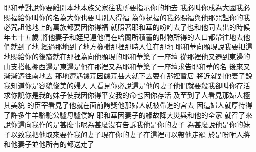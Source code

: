 \bchapter%
耶和華對說\chientien 你要離開本地\chientien 本族\chientien 父家\chientien 往我所要指示你的地去\chuan 
{}我必叫你成為大國\yuentien 我必賜福給你\chientien 叫你的名為大\chientien 你也要叫別人得福\yuentien 
{}為你祝福的\chientien 我必賜福與他\chientien 那咒詛你的\chientien 我必咒詛他\chientien 地上的萬族都要因你得福\chuan 
{}就照著耶和華的吩咐去了\yuentien{}也和他同去\yuentien {}出的時候\chientien 年七十五歲\chuan 
{}將他妻子\chientien 和姪兒\chientien 連他們在哈蘭所積蓄的財物\chientien 所得的人口\chientien 都帶往地去\yuentien 他們就到了地\chuan 
{}經過那地\chientien 到了地方橡樹那裡\yuentien 那時人住在那地\chuan 
{}耶和華向顯現\chientien 說\chientien 我要把這地賜給你的後裔\yuentien {}就在那裡為向他顯現的耶和華築了一座壇\chuan 
{}從那裡他又遷到東邊的山\chientien 支搭帳棚\yuentien 西邊是\chientien 東邊是\yuentien 他在那裡又為耶和華築了一座壇\chientien 求告耶和華的名\chuan 
{}後來又漸漸遷往南地去\chuan\Chuan
{}那地遭遇饑荒\chientien 因饑荒甚大\chientien{}就下去\chientien 要在那裡暫居\chuan 
{}將近就對他妻子說\chientien 我知道你是容貌俊美的婦人\yuentien 
{}人看見你必說\chientien 這是他的妻子\chientien 他們就要殺我\chientien 卻叫你存活\chuan 
{}求你說\chientien 你是我的妹子\chientien 使我因你得平安\chientien 我的命也因你存活\chuan 
{}及至到了\chientien {}人看見那婦人極其美貌\chuan 
{}的臣宰看見了他\chientien 就在面前誇獎他\yuentien 那婦人就被帶進的宮去\chuan 
{}因這婦人就厚待\chientien {}得了許多牛\chientien 羊\chientien 駱駝\chientien 公驢\chientien 母驢\chientien 僕婢\chuan 
{}耶和華因妻子的緣故\chientien 降大災與和他的全家\chuan 
{}就召了來\chientien 說\chientien 你這向我作的是甚麼事呢\chientien 為甚麼沒有告訴我他是你的妻子\yuentien 
{}為甚麼說\chientien 他是你的妹子\chientien 以致我把他取來要作我的妻子\yuentien 現在你的妻子在這裡\chientien 可以帶他走罷\chuan 
{}於是吩咐人將和他妻子\chientien 並他所有的都送走了\chuan 
